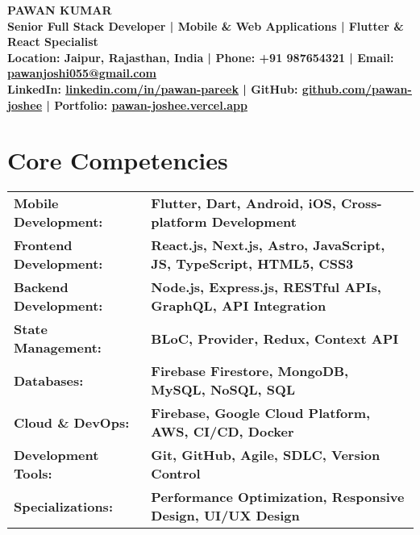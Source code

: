 \documentclass[letterpaper,11pt]{article}
\renewcommand{\textbf}[1]{{\bfseries\color{headingblack}#1}}
\begin{document}
\color{textblack}

\begin{center}
    {\color{headingblack}\Huge\bfseries PAWAN KUMAR} \\ \vspace{1pt}
    {\color{textblack}\large\bfseries Senior Full Stack Developer | Mobile \& Web Applications | Flutter \& React Specialist} \\ \vspace{2pt}
    \bfseries\color{textblack}\small{
    Location: Jaipur, Rajasthan, India | 
    Phone: +91 987654321 |
    Email: \href{mailto:pawanjoshi055@gmail.com}{\color{linkblue}\underline{pawanjoshi055@gmail.com}}}
    \\ \vspace{1pt}
    \bfseries\color{textblack}\small{
    LinkedIn: \href{https://linkedin.com/in/pawan-pareek}{\color{linkblue}\underline{linkedin.com/in/pawan-pareek}} |
    GitHub: \href{https://github.com/pawan-joshee}{\color{linkblue}\underline{github.com/pawan-joshee}} |
    Portfolio: \href{https://pawan-joshee.vercel.app}{\color{linkblue}\underline{pawan-joshee.vercel.app}}}
\end{center}

\section{Core Competencies}
\begin{tabular*}{\textwidth}{@{\extracolsep{\fill}}ll}
\textbf{Mobile Development:} & \bfseries\color{textblack}Flutter, Dart, Android, iOS, Cross-platform Development \\
\textbf{Frontend Development:} & \bfseries\color{textblack}React.js,  Next.js, Astro, JavaScript, JS, TypeScript, HTML5, CSS3 \\
\textbf{Backend Development:} & \bfseries\color{textblack}Node.js, Express.js, RESTful APIs, GraphQL, API Integration \\
\textbf{State Management:} & \bfseries\color{textblack}BLoC, Provider, Redux, Context API \\
\textbf{Databases:} & \bfseries\color{textblack}Firebase Firestore, MongoDB, MySQL, NoSQL, SQL \\
\textbf{Cloud \& DevOps:} & \bfseries\color{textblack}Firebase, Google Cloud Platform, AWS, CI/CD, Docker \\
\textbf{Development Tools:} & \bfseries\color{textblack}Git, GitHub, Agile, SDLC, Version Control \\
\textbf{Specializations:} & \bfseries\color{textblack}Performance Optimization, Responsive Design, UI/UX Design
\end{tabular*}
\end{document}
